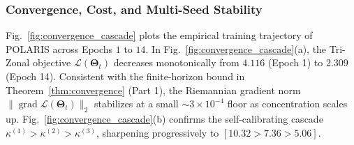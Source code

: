 \documentclass[journal]{IEEEtran}
\begin{document}
\begin{table}[!t]
\centering
\caption{Experiment 7: Spherical Pole and Antipodal Geometry Inspection of Learned POLARIS Unit Vectors $\mathbf{u} \in \mathbb{S}^{99}$. North Pole Synonyms ($\cos\theta \to +1.0$), Equatorial Orthogonals ($|\cos\theta| \le 10^{-4}$), and South Pole Antipodes ($\cos\theta \to -1.0$).}
\label{tab:exp7_qualitative}
\end{table}

\subsubsection{Convergence, Cost, and Multi-Seed Stability}
Fig.~\ref{fig:convergence_cascade} plots the empirical training trajectory of POLARIS across Epochs $1$ to $14$. In Fig.~\ref{fig:convergence_cascade}(a), the Tri-Zonal objective $\mathcal{L}(\boldsymbol{\Theta}_t)$ decreases monotonically from $4.116$ (Epoch 1) to $2.309$ (Epoch 14). Consistent with the finite-horizon bound in Theorem~\ref{thm:convergence} (Part 1), the Riemannian gradient norm $\|\operatorname{grad}\mathcal{L}(\boldsymbol{\Theta}_t)\|_2$ stabilizes at a small $\sim 3 \times 10^{-4}$ floor as concentration scales up. Fig.~\ref{fig:convergence_cascade}(b) confirms the self-calibrating cascade $\kappa^{(1)} > \kappa^{(2)} > \kappa^{(3)}$, sharpening progressively to $[10.32 > 7.36 > 5.06]$.
\end{document}
